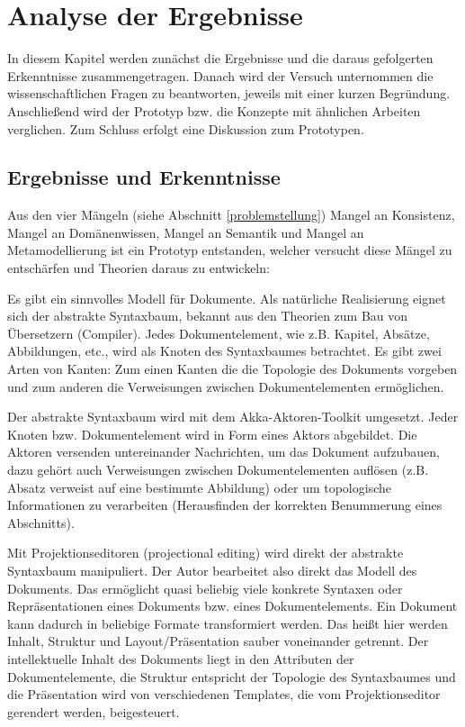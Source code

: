  
\chapter{Analyse der Ergebnisse}\label{}
 
In diesem Kapitel werden zunächst die Ergebnisse und die daraus gefolgerten Erkenntnisse zusammengetragen. Danach wird der Versuch unternommen die wissenschaftlichen Fragen zu beantworten, jeweils mit einer kurzen Begründung. Anschließend wird der Prototyp bzw. die Konzepte mit ähnlichen Arbeiten verglichen. Zum Schluss erfolgt eine Diskussion zum Prototypen.

 
\section{Ergebnisse und Erkenntnisse}\label{}
 
Aus den vier Mängeln (siehe Abschnitt \ref{problemstellung}) Mangel an Konsistenz, Mangel an Domänenwissen, Mangel an Semantik und Mangel an Metamodellierung ist ein Prototyp entstanden, welcher versucht diese Mängel zu entschärfen und Theorien daraus zu entwickeln:

 
Es gibt ein sinnvolles Modell für Dokumente. Als natürliche Realisierung eignet sich der abstrakte Syntaxbaum, bekannt aus den Theorien zum Bau von Übersetzern (Compiler). Jedes Dokumentelement, wie z.B. Kapitel, Absätze, Abbildungen, etc., wird als Knoten des Syntaxbaumes betrachtet. Es gibt zwei Arten von Kanten: Zum einen Kanten die die Topologie des Dokuments vorgeben und zum anderen die Verweisungen zwischen Dokumentelementen ermöglichen.

 
Der abstrakte Syntaxbaum wird mit dem Akka-Aktoren-Toolkit umgesetzt. Jeder Knoten bzw. Dokumentelement wird in Form eines Aktors abgebildet. Die Aktoren versenden untereinander Nachrichten, um das Dokument aufzubauen, dazu gehört auch Verweisungen zwischen Dokumentelementen auflösen (z.B. Absatz verweist auf eine bestimmte Abbildung) oder um topologische Informationen zu verarbeiten (Herausfinden der korrekten Benummerung eines Abschnitts).

 
Mit Projektionseditoren (projectional editing) wird direkt der abstrakte Syntaxbaum manipuliert. Der Autor bearbeitet also direkt das Modell des Dokuments. Das ermöglicht quasi beliebig viele konkrete Syntaxen oder Repräsentationen eines Dokuments bzw. eines Dokumentelements. Ein Dokument kann dadurch in beliebige Formate transformiert werden. Das heißt hier werden Inhalt, Struktur und Layout/Präsentation sauber voneinander getrennt. Der intellektuelle Inhalt des Dokuments liegt in den Attributen der Dokumentelemente, die Struktur entspricht der Topologie des Syntaxbaumes und die Präsentation wird von verschiedenen Templates, die vom Projektionseditor gerendert werden, beigesteuert.


